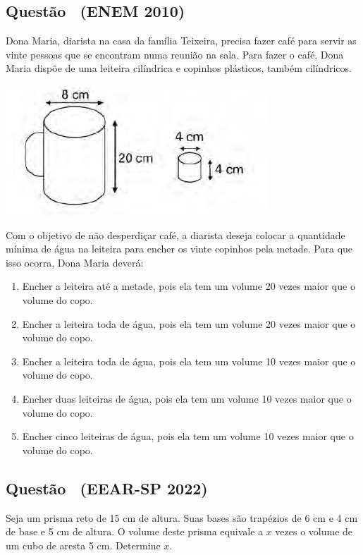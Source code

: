 \documentclass[12pt]{article}
\newcounter{questao}
\newcommand{\novaquestao}[1]{%
  \stepcounter{questao}%
  \subsection*{Questão \thequestao\ (#1)}%
}
\begin{document}
\begin{multicols}{2}
        \novaquestao{ENEM 2010}
            Dona Maria, diarista na casa da família Teixeira, precisa fazer café para servir as vinte pessoas que se encontram numa reunião na sala. Para fazer o café, Dona Maria dispõe de uma leiteira cilíndrica e copinhos plásticos, também cilíndricos.

            \begin{center}
                \includegraphics[scale=0.6]{imagem/q31.png}
            \end{center} Com o objetivo de não desperdiçar café, a diarista deseja colocar a quantidade mínima de água na leiteira para encher os vinte copinhos pela metade. Para que isso ocorra, Dona Maria deverá:

            \begin{enumerate}[label=(\alph*), noitemsep]
                \item {Encher a leiteira até a metade, pois ela tem um volume 20 vezes maior que o volume do copo.} \\ %
                \item Encher a leiteira toda de água, pois ela tem um volume 20 vezes maior que o volume do copo. \\
                \item Encher a leiteira toda de água, pois ela tem um volume 10 vezes maior que o volume do copo. \\
                \item Encher duas leiteiras de água, pois ela tem um volume 10 vezes maior que o volume do copo. \\
                \item Encher cinco leiteiras de água, pois ela tem um volume 10 vezes maior que o volume do copo. 
            \end{enumerate}
        

        \novaquestao{EEAR-SP 2022}
            Seja um prisma reto de 15 cm de altura. Suas bases são trapézios de 6 cm e 4 cm de base e 5 cm de altura. O volume deste prisma equivale a $ x $ vezes o volume de um cubo de aresta 5 cm. Determine $x$.
        

\end{multicols}
\end{document}
